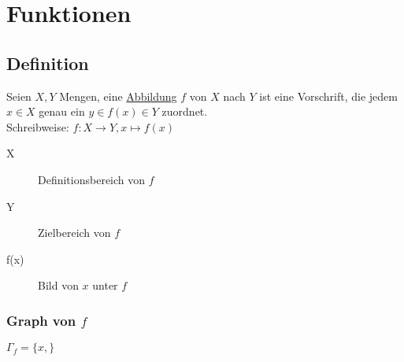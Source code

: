 \chapter{Funktionen}
\section{Definition}
Seien $X, Y$ Mengen, eine \ul{Abbildung} $f$ von $X$ nach $Y$ ist eine Vorschrift, die jedem $x \in X$ genau ein $y\in f(x) \in Y$ zuordnet.\\
Schreibweise: $f: X \to Y, x \mapsto f(x)$\\
\begin{description}
\item[X] Definitionsbereich von $f$
\item[Y] Zielbereich von $f$
\item[f(x)] Bild von $x$ unter $f$
\end{description}
\subsection*{Graph von $f$}
$\Gamma_f = \{x, \}$